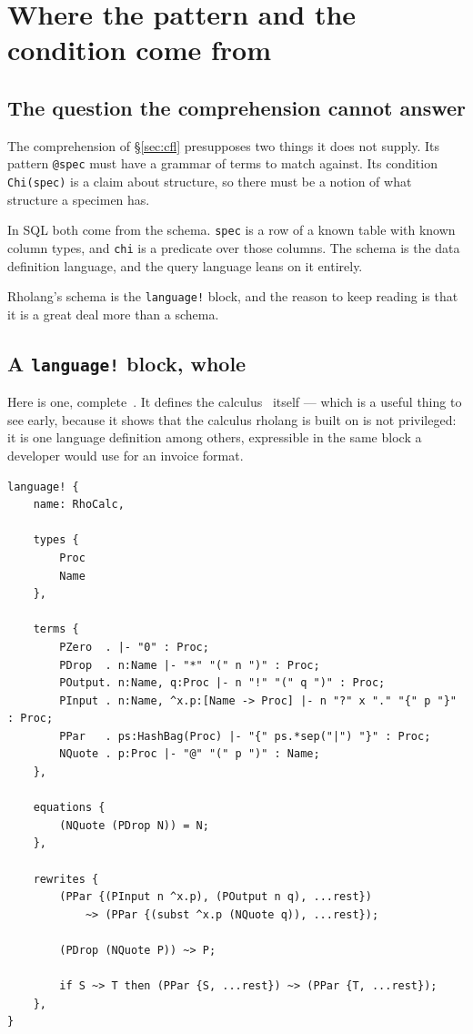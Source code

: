 \section{Where the pattern and the condition come from}
\label{sec:ddl}

\subsection{The question the comprehension cannot answer}

The comprehension of \S\ref{sec:cfl} presupposes two things it does not supply.
Its pattern \texttt{@spec} must have a grammar of terms to match against. Its condition \texttt{Chi(spec)} is a claim about
structure, so there must be a notion of what structure a specimen has.

In SQL both come from the schema. \texttt{spec} is a row of a known table with
known column types, and \texttt{chi} is a predicate over those columns. The
schema is the data definition language, and the query language leans on it
entirely.

Rholang's schema is the \texttt{language!} block, and the reason to keep reading
is that it is a great deal more than a schema.

\subsection{A \texttt{language!} block, whole}

Here is one, complete~\cite{mettailrust}. It defines the \rhoc{}
calculus~\cite{MR05} itself --- which is a
useful thing to see early, because it shows that the calculus rholang is built
on is not privileged: it is one language definition among others, expressible in
the same block a developer would use for an invoice format.

\begin{lstlisting}[language=mettail]
language! {
    name: RhoCalc,

    types {
        Proc
        Name
    },

    terms {
        PZero  . |- "0" : Proc;
        PDrop  . n:Name |- "*" "(" n ")" : Proc;
        POutput. n:Name, q:Proc |- n "!" "(" q ")" : Proc;
        PInput . n:Name, ^x.p:[Name -> Proc] |- n "?" x "." "{" p "}" : Proc;
        PPar   . ps:HashBag(Proc) |- "{" ps.*sep("|") "}" : Proc;
        NQuote . p:Proc |- "@" "(" p ")" : Name;
    },

    equations {
        (NQuote (PDrop N)) = N;
    },

    rewrites {
        (PPar {(PInput n ^x.p), (POutput n q), ...rest})
            ~> (PPar {(subst ^x.p (NQuote q)), ...rest});

        (PDrop (NQuote P)) ~> P;

        if S ~> T then (PPar {S, ...rest}) ~> (PPar {T, ...rest});
    },
}
\end{lstlisting}

